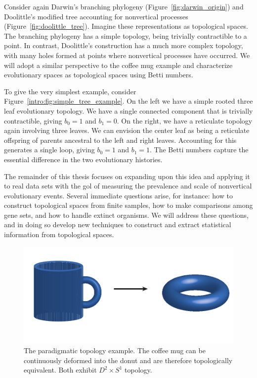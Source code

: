 Consider again Darwin's branching phylogeny (Figure~\ref{fig:darwin_origin}) and Doolittle's modified tree accounting for nonvertical processes (Figure~\ref{fig:doolittle_tree}).
Imagine these representations as topological spaces.
The branching phylogeny has a simple topology, being trivially contractible to a point.
In contrast, Doolittle's construction has a much more complex topology, with many holes formed at points where nonvertical processes have occurred.
We will adopt a similar perspective to the coffee mug example and characterize evolutionary spaces as topological spaces using Betti numbers.

To give the very simplest example, consider Figure~\ref{intro:fig:simple_tree_example}.
On the left we have a simple rooted three leaf evolutionary topology.
We have a single connected component that is trivially contractible, giving $b_0=1$ and $b_1=0$.
On the right, we have a reticulate topology again involving three leaves.
We can envision the center leaf as being a reticulate offspring of parents ancestral to the left and right leaves.
Accounting for this generates a single loop, giving $b_0=1$ and $b_1=1$.
The Betti numbers capture the essential difference in the two evolutionary histories.

The remainder of this thesis focuses on expanding upon this idea and applying it to real data sets with the gol of measuring the prevalence and scale of nonvertical evolutionary events.
Several immediate questions arise, for instance: how to construct topological spaces from finite samples, how to make comparisons among gene sets, and how to handle extinct organisms.
We will address these questions, and in doing so develop new techniques to construct and extract statistical information from topological spaces.

\begin{figure}[t]
\centering
\includegraphics[width=\columnwidth]{./fig/introduction/coffeemug_to_donut.pdf}
\caption[The coffee mug and the donut]{The paradigmatic topology example. The coffee mug can be continuously deformed into the donut and are therefore topologically equivalent. Both exhibit $D^2\times S^1$ topology.}
\label{intro:fig:coffeemug_to_donut}
\end{figure}

